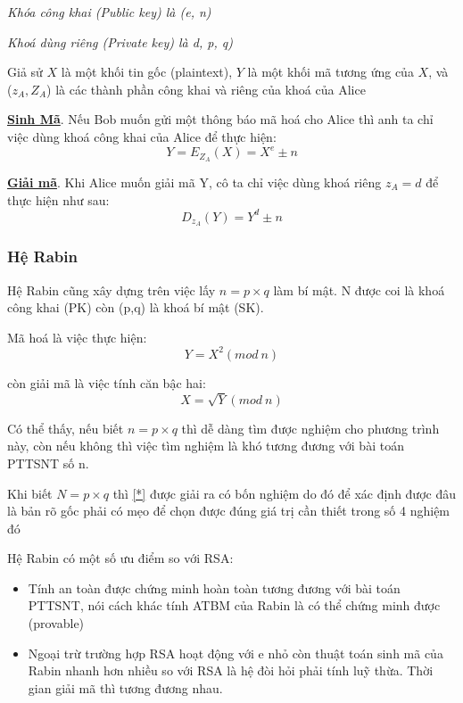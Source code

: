 \documentclass[a4paper,12pt]{report}
\begin{document}
\textit{Khóa công khai (Public key) là (e, n)}

\textit{Khoá dùng riêng (Private key) là d, p, q)}

Giả sử $X$ là một khối tin gốc (plaintext), $Y$ là một khối mã tương ứng của $X$, và ($z_A, Z_A$) là các thành phần công khai và riêng của khoá của Alice

\textbf{\underline{Sinh Mã}}. Nếu Bob muốn gửi một thông báo mã hoá cho Alice thì anh ta chỉ việc dùng khoá công khai của Alice để thực hiện:
\begin{displaymath}
Y = E_{Z_A}(X) = X^e \pm n
\end{displaymath}

\textbf{\underline{Giải mã}}. Khi Alice muốn giải mã Y, cô ta chỉ việc dùng khoá riêng $z_A = d$ để thực hiện như sau:
\begin{displaymath}
D_{z_A}(Y) = Y^d \pm n
\end{displaymath}
\subsubsection{Hệ Rabin}
Hệ Rabin cũng xây dựng trên việc lấy $n=p\times q$ làm bí mật. N được coi là khoá công khai (PK) còn (p,q) là khoá bí mật (SK).

Mã hoá là việc thực hiện:
\begin{displaymath}
Y = X^2 (mod \ n)
\end{displaymath}

còn giải mã là việc tính căn bậc hai:
\begin{equation}
X = \sqrt{Y} (mod \ n)  \label{*} 
\end{equation}

Có thể thấy, nếu biết $n=p\times q$ thì dễ dàng tìm được nghiệm cho phương trình này, còn nếu không thì việc tìm nghiệm là khó tương đương với bài toán PTTSNT số n.

Khi biết $N=p\times q$ thì \ref{*} được giải ra có bốn nghiệm do đó để xác định được đâu là bản rõ gốc phải có mẹo để chọn được đúng giá trị cần thiết trong số 4 nghiệm đó

Hệ Rabin có một số ưu điểm so với RSA:
\begin{itemize}
\item Tính an toàn được chứng minh hoàn toàn tương đương với bài toán PTTSNT, nói cách khác tính ATBM của Rabin là có thể chứng minh  được (provable)
\item Ngoại trừ trường hợp RSA hoạt động với e nhỏ còn thuật toán sinh mã của Rabin nhanh hơn nhiều so với RSA là hệ đòi hỏi phải tính luỹ thừa. Thời gian giải mã thì
tương đương nhau.
\end{itemize}
\end{document}
